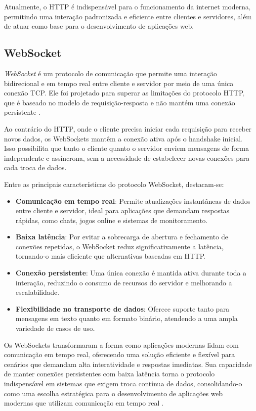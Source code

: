 Atualmente, o HTTP é indispensável para o funcionamento da internet moderna, permitindo uma interação padronizada e eficiente entre clientes e servidores, além de atuar como base para o desenvolvimento de aplicações web.

\subsection{WebSocket}

\emph{WebSocket} é um protocolo de comunicação que permite uma interação bidirecional e em tempo real entre cliente e servidor por meio de uma única conexão TCP. Ele foi projetado para superar as limitações do protocolo HTTP, que é baseado no modelo de requisição-resposta e não mantém uma conexão persistente \cite{ws-standard}.

Ao contrário do HTTP, onde o cliente precisa iniciar cada requisição para receber novos dados, os WebSockets mantêm a conexão ativa após o handshake inicial. Isso possibilita que tanto o cliente quanto o servidor enviem mensagens de forma independente e assíncrona, sem a necessidade de estabelecer novas conexões para cada troca de dados. 

Entre as principais características do protocolo WebSocket, destacam-se:

\begin{itemize}
    \item \textbf{Comunicação em tempo real}: Permite atualizações instantâneas de dados entre cliente e servidor, ideal para aplicações que demandam respostas rápidas, como chats, jogos online e sistemas de monitoramento.
    \item \textbf{Baixa latência}: Por evitar a sobrecarga de abertura e fechamento de conexões repetidas, o WebSocket reduz significativamente a latência, tornando-o mais eficiente que alternativas baseadas em HTTP.
    \item \textbf{Conexão persistente}: Uma única conexão é mantida ativa durante toda a interação, reduzindo o consumo de recursos do servidor e melhorando a escalabilidade.
    \item \textbf{Flexibilidade no transporte de dados}: Oferece suporte tanto para mensagens em texto quanto em formato binário, atendendo a uma ampla variedade de casos de uso.
\end{itemize}

Os WebSockets transformaram a forma como aplicações modernas lidam com comunicação em tempo real, oferecendo uma solução eficiente e flexível para cenários que demandam alta interatividade e respostas imediatas. Sua capacidade de manter conexões persistentes com baixa latência torna o protocolo indispensável em sistemas que exigem troca contínua de dados, consolidando-o como uma escolha estratégica para o desenvolvimento de aplicações web modernas que utilizam comunicação em tempo real \cite{murley2021websocket}.


